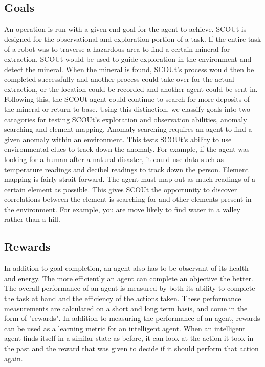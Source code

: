 \subsection{Goals}
An operation is run with a given end goal for the agent to achieve.
SCOUt is designed for the observational and exploration portion of a task.
If the entire task of a robot was to traverse a hazardous area to find a certain mineral for extraction.
SCOUt would be used to guide exploration in the environment and detect the mineral.
When the mineral is found, SCOUt's process would then be completed successfully and another process could take over for the actual extraction, or the location could be recorded and another agent could be sent in.
Following this, the SCOUt agent could continue to search for more deposits of the mineral or return to base.
Using this distinction, we classify goals into two catagories for testing SCOUt's exploration and observation abilities, anomaly searching and element mapping.
Anomaly searching requires an agent to find a given anomaly within an environment.
This tests SCOUt's ability to use environmental clues to track down the anomaly.
For example, if the agent was looking for a human after a natural disaster, it could use data such as temperature readings and decibel readings to track down the person.
Element mapping is fairly strait forward.
The agent must map out as much readings of a certain element as possible.
This gives SCOUt the opportunity to discover correlations between the element is searching for and other elements present in the environment.
For example, you are move likely to find water in a valley rather than a hill.


\subsection{Rewards}
In addition to goal completion, an agent also has to be observant of its health and energy.
The more efficiently an agent can complete an objective the better.
The overall performance of an agent is measured by both its ability to complete the task at hand and the efficiency of the actions taken.
These performance measurements are calculated on a short and long term basis, and come in the form of "rewards".
In addition to measuring the performance of an agent, rewards can be used as a learning metric for an intelligent agent.
When an intelligent agent finds itself in a similar state as before, it can look at the action it took in the past and the reward that was given to decide if it should perform that action again.

